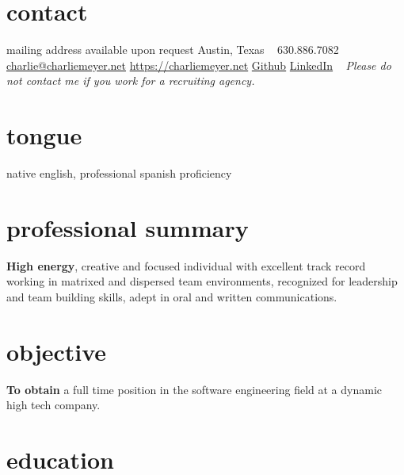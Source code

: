 \documentclass['print']{friggeri-cv} %
\begin{document}


\begin{aside} %
\section{contact}
mailing address available upon request
Austin, Texas
~
630.886.7082
~
\href{mailto:charlie@charliemeyer.net}{charlie@charliemeyer.net}
\href{https://charliemeyer.net}{https://charliemeyer.net}
\href{https://www.github.com/cemeyer2}{Github}
\href{www.linkedin.com/in/cemeyer2}{LinkedIn}
~
\emph{Please do not contact me if you work for a recruiting agency.}
\section{tongue}
native english,
professional spanish proficiency
\end{aside}

\section{professional summary}

\textbf{High energy}, creative and focused individual with excellent track record working in matrixed and dispersed team environments, recognized for leadership and team building skills, adept in oral and written communications.

\section{objective}

\textbf{To obtain} a full time position in the software engineering field at a dynamic high tech company.


\section{education}
\end{document}
